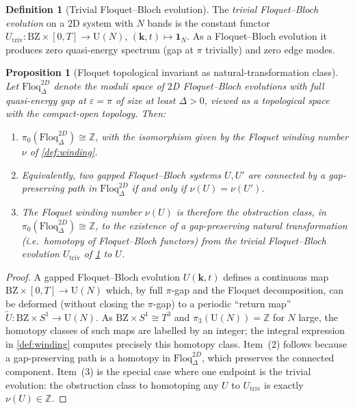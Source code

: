 \documentclass[12pt]{article}
\newtheorem{proposition}[theorem]{Proposition}
\theoremstyle{definition}
\newtheorem{definition}[theorem]{Definition}
\theoremstyle{remark}
\newcommand{\Z}{\mathbb{Z}}
\newcommand{\one}{\mathbf{1}}
\begin{document}
\begin{definition}[Trivial Floquet--Bloch evolution]
\label{def:trivial-fb}
The \emph{trivial Floquet--Bloch evolution} on a $2$D system with $N$ bands is the constant functor
$U_{\mathrm{triv}}\colon\mathrm{BZ}\times[0,T]\to\mathrm{U}(N)$,
$(\mathbf{k},t)\mapsto\one_N$. As a Floquet--Bloch evolution it produces zero quasi-energy spectrum (gap at $\pi$ trivially) and zero edge modes.
\end{definition}

\begin{proposition}[Floquet topological invariant as natural-transformation class]
\label{prop:floquet-natural}
Let $\mathrm{Floq}^{2D}_\Delta$ denote the moduli space of $2$D Floquet--Bloch evolutions with full quasi-energy gap at $\varepsilon=\pi$ of size at least $\Delta>0$, viewed as a topological space with the compact-open topology. Then:
\begin{enumerate}
\item $\pi_0(\mathrm{Floq}^{2D}_\Delta) \cong \Z$, with the isomorphism given by the Floquet winding number $\nu$ of \cref{def:winding}.
\item Equivalently, two gapped Floquet--Bloch systems $U,U'$ are connected by a gap-preserving path in $\mathrm{Floq}^{2D}_\Delta$ if and only if $\nu(U)=\nu(U')$.
\item The Floquet winding number $\nu(U)$ is therefore the obstruction class, in $\pi_0(\mathrm{Floq}^{2D}_\Delta)\cong\Z$, to the existence of a gap-preserving natural transformation (i.e.\ homotopy of Floquet--Bloch functors) from the trivial Floquet--Bloch evolution $U_{\mathrm{triv}}$ of \cref{def:trivial-fb} to $U$.
\end{enumerate}
\end{proposition}

\begin{proof}
A gapped Floquet--Bloch evolution $U(\mathbf{k},t)$ defines a continuous map $\mathrm{BZ}\times[0,T]\to\mathrm{U}(N)$ which, by full $\pi$-gap and the Floquet decomposition, can be deformed (without closing the $\pi$-gap) to a periodic ``return map'' $\widetilde{U}\colon\mathrm{BZ}\times S^1\to\mathrm{U}(N)$. As $\mathrm{BZ}\times S^1\cong T^3$ and $\pi_3(\mathrm{U}(N))=\Z$ for $N$ large, the homotopy classes of such maps are labelled by an integer; the integral expression in \cref{def:winding} computes precisely this homotopy class. Item~(2) follows because a gap-preserving path is a homotopy in $\mathrm{Floq}^{2D}_\Delta$, which preserves the connected component. Item~(3) is the special case where one endpoint is the trivial evolution: the obstruction class to homotoping any $U$ to $U_{\mathrm{triv}}$ is exactly $\nu(U)\in\Z$.
\end{proof}
\end{document}
